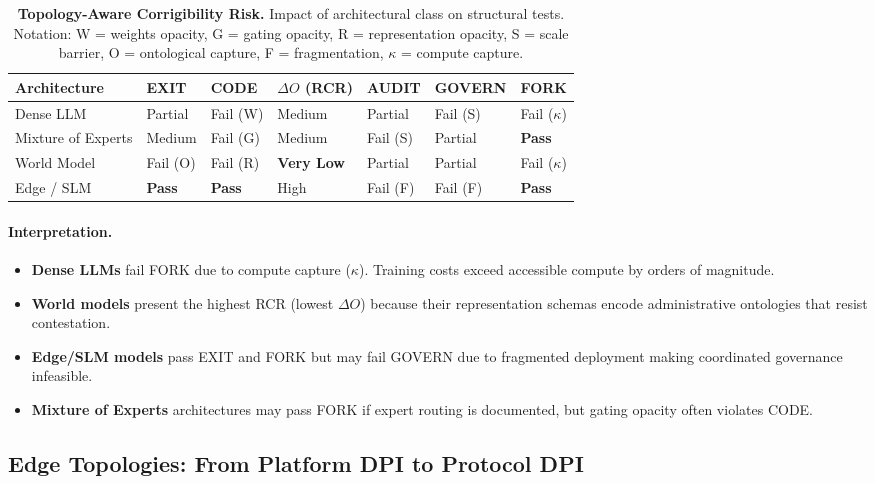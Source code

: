 \documentclass[11pt,a4paper]{article}
\theoremstyle{definition}
\begin{document}
\begin{table}[htbp]
\centering
\caption{\textbf{Topology-Aware Corrigibility Risk.} Impact of architectural class on structural tests. Notation: W = weights opacity, G = gating opacity, R = representation opacity, S = scale barrier, O = ontological capture, F = fragmentation, $\kappa$ = compute capture.}
\label{tab:topology-risk-arch}
\small
\begin{tabular}{@{}lllllll@{}}
\toprule
\textbf{Architecture} & \textbf{EXIT} & \textbf{CODE} & \textbf{$\Delta O$ (RCR)} & \textbf{AUDIT} & \textbf{GOVERN} & \textbf{FORK} \\
\midrule
Dense LLM & Partial & Fail (W) & Medium & Partial & Fail (S) & Fail ($\kappa$) \\
Mixture of Experts & Medium & Fail (G) & Medium & Fail (S) & Partial & \textbf{Pass} \\
World Model & Fail (O) & Fail (R) & \textbf{Very Low} & Partial & Partial & Fail ($\kappa$) \\
Edge / SLM & \textbf{Pass} & \textbf{Pass} & High & Fail (F) & Fail (F) & \textbf{Pass} \\
\bottomrule
\end{tabular}
\end{table}

\paragraph{Interpretation.}
\begin{itemize}[noitemsep]
    \item \textbf{Dense LLMs} fail FORK due to compute capture ($\kappa$). Training costs exceed accessible compute by orders of magnitude.
    \item \textbf{World models} present the highest RCR (lowest $\Delta O$) because their representation schemas encode administrative ontologies that resist contestation.
    \item \textbf{Edge/SLM models} pass EXIT and FORK but may fail GOVERN due to fragmented deployment making coordinated governance infeasible.
    \item \textbf{Mixture of Experts} architectures may pass FORK if expert routing is documented, but gating opacity often violates CODE.
\end{itemize}

\subsection{Edge Topologies: From Platform DPI to Protocol DPI}
\end{document}
